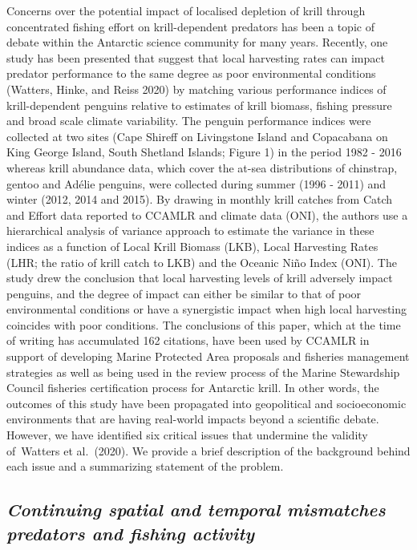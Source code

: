 \documentclass[]{elsarticle} %
\begin{document}
Concerns over the potential impact of localised depletion of krill
through concentrated fishing effort on krill-dependent predators has
been a topic of debate within the Antarctic science community for many
years. Recently, one study has been presented that suggest that local
harvesting rates can impact predator performance to the same degree as
poor environmental conditions (Watters, Hinke, and Reiss 2020) by
matching various performance indices of krill-dependent penguins
relative to estimates of krill biomass, fishing pressure and broad scale
climate variability. The penguin performance indices were collected at
two sites (Cape Shireff on Livingstone Island and Copacabana on King
George Island, South Shetland Islands; Figure 1) in the period 1982 -
2016 whereas krill abundance data, which cover the at-sea distributions
of chinstrap, gentoo and Adélie penguins, were collected during summer
(1996 - 2011) and winter (2012, 2014 and 2015). By drawing in monthly
krill catches from Catch and Effort data reported to CCAMLR and climate
data (ONI), the authors use a hierarchical analysis of variance approach
to estimate the variance in these indices as a function of Local Krill
Biomass (LKB), Local Harvesting Rates (LHR; the ratio of krill catch to
LKB) and the Oceanic Niño Index (ONI). The study drew the conclusion
that local harvesting levels of krill adversely impact penguins, and the
degree of impact can either be similar to that of poor environmental
conditions or have a synergistic impact when high local harvesting
coincides with poor conditions. The conclusions of this paper, which at
the time of writing has accumulated 162 citations, have been used by
CCAMLR in support of developing Marine Protected Area proposals and
fisheries management strategies as well as being used in the review
process of the Marine Stewardship Council fisheries certification
process for Antarctic krill. In other words, the outcomes of this study
have been propagated into geopolitical and socioeconomic environments
that are having real-world impacts beyond a scientific debate. However,
we have identified six critical issues that undermine the validity
of~Watters et al.~(2020). We provide a brief description of the
background behind each issue and a summarizing statement of the problem.

\subsection{\texorpdfstring{\emph{Continuing spatial and temporal
mismatches predators and fishing
activity}}{Continuing spatial and temporal mismatches predators and fishing activity}}\label{continuing-spatial-and-temporal-mismatches-predators-and-fishing-activity}
\end{document}
